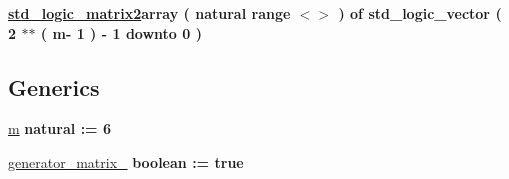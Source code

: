 \begin{DoxyCompactItemize}
\item 
\hypertarget{group___r_m_encoder_ga276be67840f4fbd1d23853217df170f2}{{\bfseries \hyperlink{group___r_m_encoder_ga276be67840f4fbd1d23853217df170f2}{std\+\_\+logic\+\_\+matrix2}{\bfseries \textcolor{vhdlchar}{array}\textcolor{vhdlchar}{ }\textcolor{vhdlchar}{(}\textcolor{vhdlchar}{ }\textcolor{vhdlchar}{natural}\textcolor{vhdlchar}{ }\textcolor{vhdlchar}{range}\textcolor{vhdlchar}{ }\textcolor{vhdlchar}{$<$$>$}\textcolor{vhdlchar}{ }\textcolor{vhdlchar}{)}\textcolor{vhdlchar}{ }\textcolor{vhdlchar}{ }\textcolor{vhdlchar}{of}\textcolor{vhdlchar}{ }\textcolor{vhdlchar}{std\+\_\+logic\+\_\+vector}\textcolor{vhdlchar}{ }\textcolor{vhdlchar}{(}\textcolor{vhdlchar}{ }\textcolor{vhdlchar}{ } \textcolor{vhdldigit}{2} \textcolor{vhdlchar}{$\ast$}\textcolor{vhdlchar}{$\ast$}\textcolor{vhdlchar}{ }\textcolor{vhdlchar}{(}\textcolor{vhdlchar}{ }\textcolor{vhdlchar}{ }\textcolor{vhdlchar}{ }\textcolor{vhdlchar}{ }\textcolor{vhdlchar}{m}\textcolor{vhdlchar}{-\/}\textcolor{vhdlchar}{ } \textcolor{vhdldigit}{1} \textcolor{vhdlchar}{ }\textcolor{vhdlchar}{)}\textcolor{vhdlchar}{ }\textcolor{vhdlchar}{-\/}\textcolor{vhdlchar}{ } \textcolor{vhdldigit}{1} \textcolor{vhdlchar}{ }\textcolor{vhdlchar}{downto}\textcolor{vhdlchar}{ }\textcolor{vhdlchar}{ } \textcolor{vhdldigit}{0} \textcolor{vhdlchar}{ }\textcolor{vhdlchar}{)}\textcolor{vhdlchar}{ }}} }\label{group___r_m_encoder_ga276be67840f4fbd1d23853217df170f2}

\end{DoxyCompactItemize}
\subsection*{Generics}
 \begin{DoxyCompactItemize}
\item 
\hypertarget{group___r_m_encoder_gad4fc2116999466ec7397a88a6e28908b}{\hyperlink{group___r_m_encoder_gad4fc2116999466ec7397a88a6e28908b}{m} {\bfseries {\bfseries \textcolor{vhdlchar}{natural}\textcolor{vhdlchar}{ }\textcolor{vhdlchar}{ }\textcolor{vhdlchar}{\+:}\textcolor{vhdlchar}{=}\textcolor{vhdlchar}{ }\textcolor{vhdlchar}{ } \textcolor{vhdldigit}{6} \textcolor{vhdlchar}{ }}}}\label{group___r_m_encoder_gad4fc2116999466ec7397a88a6e28908b}

\item 
\hypertarget{group___r_m_encoder_gaa6a3bcd7caff4ed469a24b721a55d4f2}{\hyperlink{group___r_m_encoder_gaa6a3bcd7caff4ed469a24b721a55d4f2}{generator\+\_\+matrix\+\_} {\bfseries {\bfseries \textcolor{vhdlchar}{boolean}\textcolor{vhdlchar}{ }\textcolor{vhdlchar}{ }\textcolor{vhdlchar}{\+:}\textcolor{vhdlchar}{=}\textcolor{vhdlchar}{ }\textcolor{vhdlchar}{ }\textcolor{vhdlchar}{ }\textcolor{vhdlchar}{ }\textcolor{vhdlchar}{true}\textcolor{vhdlchar}{ }}}}\label{group___r_m_encoder_gaa6a3bcd7caff4ed469a24b721a55d4f2}

\end{DoxyCompactItemize}
